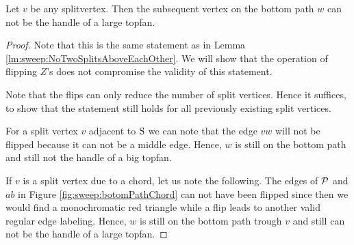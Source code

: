   \begin{lemma}
    \label{lm:zflip:NoTwoSplitsAboveEachOtherVertOnesided}
    Let $v$ be any splitvertex. Then the subsequent vertex on the bottom path $w$ can not be the handle of a large topfan.
  \end{lemma}

  \begin{proof}
    Note that this is the same statement as in Lemma \ref{lm:sweep:NoTwoSplitsAboveEachOther}. We will show that the operation of flipping $Z$'s does not compromise the validity of this statement.

    Note that the flips can only reduce the number of split vertices.
    Hence it suffices, to show that the statement still holds for all previously existing split vertices.

    For a split vertex $v$ adjacent to $\pS$ we can note that the edge $vw$ will not be flipped because it can not be a middle edge.
    Hence, $w$ is still on the bottom path and still not the handle of a big topfan.

    If $v$ is a split vertex due to a chord, let us note the following.
    The edges of $\P$ and $ab$ in Figure \ref{fig:sweep:botomPathChord} can not have been flipped since then we would find a monochromatic red triangle while a flip leads to another valid regular edge labeling.
    Hence, $w$ is still on the bottom path trough $v$ and still can not be the handle of a large topfan.
  \end{proof}
